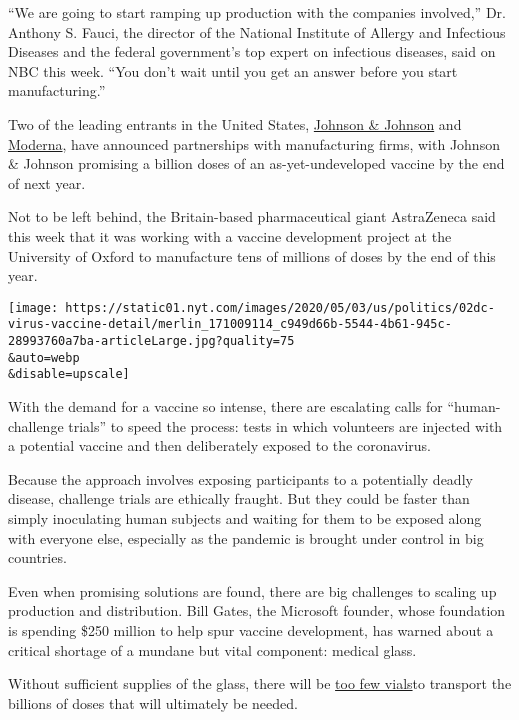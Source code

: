 ``We are going to start ramping up production with the companies
involved,'' Dr. Anthony S. Fauci, the director of the National Institute
of Allergy and Infectious Diseases and the federal government's top
expert on infectious diseases, said on NBC this week. ``You don't wait
until you get an answer before you start manufacturing.''

Two of the leading entrants in the United States,
\href{https://www.nytimes.com/2020/05/19/business/johnson-baby-powder-sales-stopped.html}{Johnson
\& Johnson} and
\href{https://www.nytimes.com/2020/05/18/health/coronavirus-vaccine-moderna.html}{Moderna},
have announced partnerships with manufacturing firms, with Johnson \&
Johnson promising a billion doses of an as-yet-undeveloped vaccine by
the end of next year.

Not to be left behind, the Britain-based pharmaceutical giant
AstraZeneca said this week that it was working with a vaccine
development project at the University of Oxford to manufacture tens of
millions of doses by the end of this year.

\texttt{[image: https://static01.nyt.com/images/2020/05/03/us/politics/02dc-virus-vaccine-detail/merlin\_171009114\_c949d66b-5544-4b61-945c-28993760a7ba-articleLarge.jpg?quality=75\\\&auto=webp\\\&disable=upscale]}

With the demand for a vaccine so intense, there are escalating calls for
``human-challenge trials'' to speed the process: tests in which
volunteers are injected with a potential vaccine and then deliberately
exposed to the coronavirus.

Because the approach involves exposing participants to a potentially
deadly disease, challenge trials are ethically fraught. But they could
be faster than simply inoculating human subjects and waiting for them to
be exposed along with everyone else, especially as the pandemic is
brought under control in big countries.

Even when promising solutions are found, there are big challenges to
scaling up production and distribution. Bill Gates, the Microsoft
founder, whose foundation is spending \$250 million to help spur vaccine
development, has warned about a critical shortage of a mundane but vital
component: medical glass.

Without sufficient supplies of the glass, there will be
\href{https://www.nytimes.com/2020/05/01/health/coronavirus-vaccine-supplies.html}{too
few vials}to transport the billions of doses that will ultimately be
needed.

